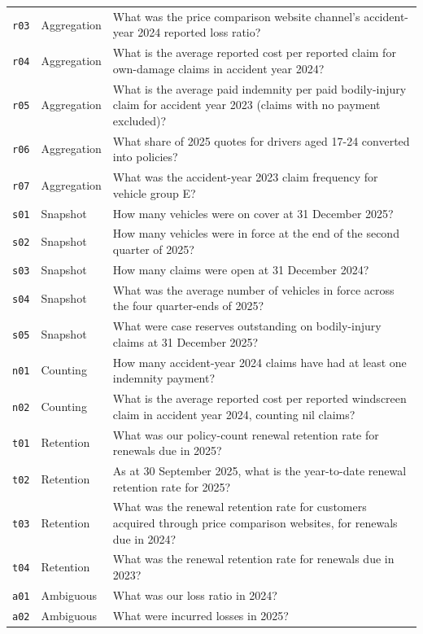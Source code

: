 {\begin{longtable}{p{0.6cm}p{2.2cm}p{11.5cm}}
\texttt{r03} & Aggregation & What was the price comparison website channel's accident-year 2024 reported loss ratio? \\
\texttt{r04} & Aggregation & What is the average reported cost per reported claim for own-damage claims in accident year 2024? \\
\texttt{r05} & Aggregation & What is the average paid indemnity per paid bodily-injury claim for accident year 2023 (claims with no payment excluded)? \\
\texttt{r06} & Aggregation & What share of 2025 quotes for drivers aged 17-24 converted into policies? \\
\texttt{r07} & Aggregation & What was the accident-year 2023 claim frequency for vehicle group E? \\
\texttt{s01} & Snapshot & How many vehicles were on cover at 31 December 2025? \\
\texttt{s02} & Snapshot & How many vehicles were in force at the end of the second quarter of 2025? \\
\texttt{s03} & Snapshot & How many claims were open at 31 December 2024? \\
\texttt{s04} & Snapshot & What was the average number of vehicles in force across the four quarter-ends of 2025? \\
\texttt{s05} & Snapshot & What were case reserves outstanding on bodily-injury claims at 31 December 2025? \\
\texttt{n01} & Counting & How many accident-year 2024 claims have had at least one indemnity payment? \\
\texttt{n02} & Counting & What is the average reported cost per reported windscreen claim in accident year 2024, counting nil claims? \\
\texttt{t01} & Retention & What was our policy-count renewal retention rate for renewals due in 2025? \\
\texttt{t02} & Retention & As at 30 September 2025, what is the year-to-date renewal retention rate for 2025? \\
\texttt{t03} & Retention & What was the renewal retention rate for customers acquired through price comparison websites, for renewals due in 2024? \\
\texttt{t04} & Retention & What was the renewal retention rate for renewals due in 2023? \\
\texttt{a01} & Ambiguous & What was our loss ratio in 2024? \\
\texttt{a02} & Ambiguous & What were incurred losses in 2025? \\

\end{longtable}}
